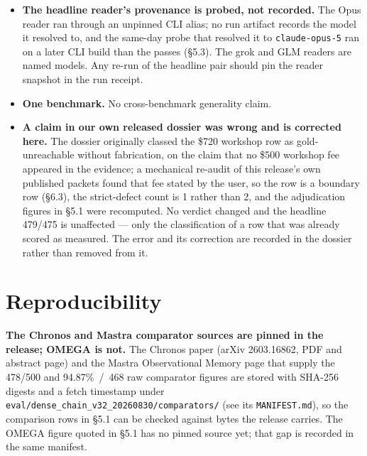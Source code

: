 \documentclass[11pt]{article}
\begin{document}
\begin{itemize}
reader family; the exact number moves a few points across readers, though the
chain's ranking of readers is stable.
\item \textbf{The headline reader's provenance is probed, not recorded.} The
Opus reader ran through an unpinned CLI alias; no run artifact records the
model it resolved to, and the same-day probe that resolved it to
\texttt{claude-opus-5} ran on a later CLI build than the passes (\S5.3). The
grok and GLM readers are named models. Any re-run of the headline pair should
pin the reader snapshot in the run receipt.
\item \textbf{One benchmark.} No cross-benchmark generality claim.
\item \textbf{A claim in our own released dossier was wrong and is corrected
here.} The dossier originally classed the \$720 workshop row as
gold-unreachable without fabrication, on the claim that no \$500 workshop fee
appeared in the evidence; a mechanical re-audit of this release's own
published packets found that fee stated by the user, so the row is a boundary
row (\S6.3), the strict-defect count is 1 rather than 2, and the adjudication
figures in \S5.1 were recomputed. No verdict changed and the headline 479/475
is unaffected --- only the classification of a row that was already scored as
measured. The error and its correction are recorded in the dossier rather
than removed from it.
\end{itemize}

\section{Reproducibility}
\textbf{The Chronos and Mastra comparator sources are pinned in the release;
OMEGA is not.} The Chronos paper (arXiv 2603.16862, PDF and abstract page)
and the Mastra Observational Memory page that supply the 478/500 and
94.87\%~/~468 raw comparator figures are stored with SHA-256 digests and a
fetch timestamp under \texttt{eval/dense\_chain\_v32\_20260830/comparators/}
(see its \texttt{MANIFEST.md}), so the comparison rows in \S5.1 can be
checked against bytes the release carries. The OMEGA figure quoted in \S5.1
has no pinned source yet; that gap is recorded in the same manifest.
\end{document}
